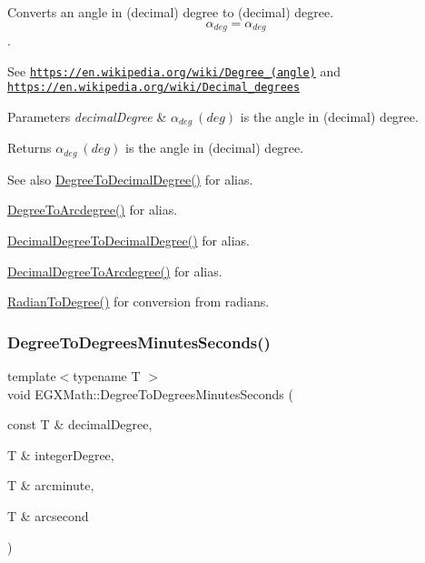 Converts an angle in (decimal) degree to (decimal) degree. \[\alpha_{deg}=\alpha_{deg}\]. 

See \href{https://en.wikipedia.org/wiki/Degree_(angle)}{\tt https\+://en.\+wikipedia.\+org/wiki/\+Degree\+\_\+(angle)} and \href{https://en.wikipedia.org/wiki/Decimal_degrees}{\tt https\+://en.\+wikipedia.\+org/wiki/\+Decimal\+\_\+degrees} 
\begin{DoxyParams}{Parameters}
{\em decimal\+Degree} & $\alpha_{deg}\ (deg)$ is the angle in (decimal) degree. \\
\hline
\end{DoxyParams}
\begin{DoxyReturn}{Returns}
$\alpha_{deg}\ (deg)$ is the angle in (decimal) degree. 
\end{DoxyReturn}
\begin{DoxySeeAlso}{See also}
\mbox{\hyperlink{group___e_g_x_math-_angle_conversions-_degree_ga568afc1d436d425bf5d4edea584aee08}{Degree\+To\+Decimal\+Degree()}} for alias. 

\mbox{\hyperlink{group___e_g_x_math-_angle_conversions-_degree_gac1b5f3b68f66c77a6df4ceef842c9b19}{Degree\+To\+Arcdegree()}} for alias. 

\mbox{\hyperlink{group___e_g_x_math-_angle_conversions-_decimal_degree_gafccf9cd779903872887978ab9d79661f}{Decimal\+Degree\+To\+Decimal\+Degree()}} for alias. 

\mbox{\hyperlink{group___e_g_x_math-_angle_conversions-_decimal_degree_gacdd463fcabffeb598ebda65b012ce743}{Decimal\+Degree\+To\+Arcdegree()}} for alias. 

\mbox{\hyperlink{group___e_g_x_math-_angle_conversions-_radian_ga25bbce6cdc1c3621f2a158d320e3bc45}{Radian\+To\+Degree()}} for conversion from radians. 
\end{DoxySeeAlso}
\mbox{\label{group___e_g_x_math-_angle_conversions-_degree_ga859585939255d52d010c780c68eb6e23}} 
\subsubsection{\texorpdfstring{Degree\+To\+Degrees\+Minutes\+Seconds()}{DegreeToDegreesMinutesSeconds()}}
{\footnotesize\ttfamily template$<$typename T $>$ \\
void E\+G\+X\+Math\+::\+Degree\+To\+Degrees\+Minutes\+Seconds (\begin{DoxyParamCaption}\item[{const T \&}]{decimal\+Degree,  }\item[{T \&}]{integer\+Degree,  }\item[{T \&}]{arcminute,  }\item[{T \&}]{arcsecond }\end{DoxyParamCaption})}



